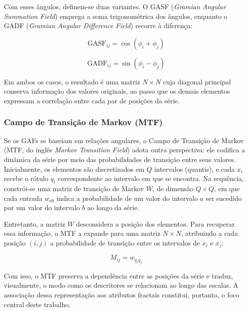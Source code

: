 Com esses ângulos, definem-se duas variantes. O GASF (\textit{Gramian Angular Summation Field}) emprega a soma trigonométrica dos ângulos, enquanto o GADF (\textit{Gramian Angular Difference Field}) recorre à diferença:

\begin{equation}
\text{GASF}_{ij} = \cos(\phi_i + \phi_j)
\end{equation}

\begin{equation}
\text{GADF}_{ij} = \sin(\phi_i - \phi_j)
\end{equation}

Em ambos os casos, o resultado é uma matriz $N \times N$ cuja diagonal principal conserva informação dos valores originais, ao passo que os demais elementos expressam a correlação entre cada par de posições da série.

\subsubsection{Campo de Transição de Markov (MTF)}
\hspace{+15pt}

Se os GAFs se baseiam em relações angulares, o Campo de Transição de Markov (MTF, do inglês \textit{Markov Transition Field}) adota outra perspectiva: ele codifica a dinâmica da série por meio das probabilidades de transição entre seus valores. %
Inicialmente, os elementos são discretizados em $Q$ intervalos (quantis), e cada $x_i$ recebe o rótulo $q_i$ correspondente ao intervalo em que se encontra. Na sequência, constrói-se uma matriz de transição de Markov $W$, de dimensão $Q \times Q$, em que cada entrada $w_{ab}$ indica a probabilidade de um valor do intervalo $a$ ser sucedido por um valor do intervalo $b$ ao longo da série.

Entretanto, a matriz $W$ desconsidera a posição dos elementos. Para recuperar essa informação, o MTF a expande para uma matriz $N \times N$, atribuindo a cada posição $(i,j)$ a probabilidade de transição entre os intervalos de $x_i$ e $x_j$:

\begin{equation}
M_{ij} = w_{q_i q_j}
\end{equation}

Com isso, o MTF preserva a dependência entre as posições da série e traduz, visualmente, o modo como os descritores se relacionam ao longo das escalas. A associação dessa representação aos atributos fractais constitui, portanto, o foco central deste trabalho.

